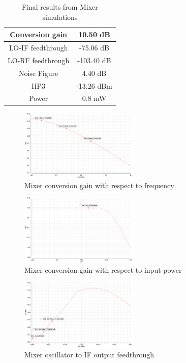 \begin{table}[H]
\begin{center}
	\begin{tabular}{ |c | c | }
 		\hline                      
  		Conversion gain &  10.50 dB\\ \hline
  		LO-IF feedthrough &  -75.06 dB\\ \hline
  		LO-RF feedthrough & -103.40 dB\\ \hline
		Noise Figure &  4.40 dB\\ \hline
		IIP3 & -13.26 dBm\\ \hline
		Power & 0.8 mW \\ 
  		\hline  
	\end{tabular}

\end{center}
\caption{Final results from Mixer simulations}
\label{tab:mixerresults}
\end{table}

\begin{figure}[H]
   \centering
    \includegraphics[width=0.5\textwidth]{figures/MixerConversionGainFreq.png}
    \caption{Mixer conversion gain with respect to frequency}
    \label{fig:cgfreq}
\end{figure}

\begin{figure}[H]
   \centering
    \includegraphics[width=0.5\textwidth]{figures/MixerConversionGain.png}
    \caption{Mixer conversion gain with respect to input power}
    \label{fig:cgpwr}
\end{figure}


\begin{figure}[H]
   \centering
    \includegraphics[width=0.5\textwidth]{figures/MixerLO-IFfeed.png}
    \caption{Mixer oscillator to IF output feedthrough}
    \label{fig:loif}
\end{figure}

